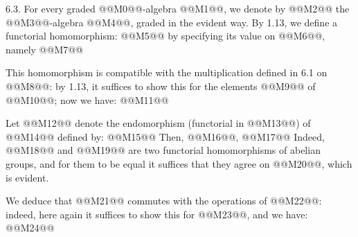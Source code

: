 6.3.
For every graded @@M0@@-algebra @@M1@@, we denote by @@M2@@ the @@M3@@-algebra @@M4@@, graded in the evident way. By 1.13, we define a functorial homomorphism: @@M5@@ by specifying its value on @@M6@@, namely
@@M7@@

This homomorphism is compatible with the multiplication defined in 6.1 on @@M8@@: by 1.13, it suffices to show this for the elements @@M9@@ of @@M10@@; now we have:
@@M11@@

Let @@M12@@ denote the endomorphism (functorial in @@M13@@) of @@M14@@ defined by:
@@M15@@
Then, @@M16@@,
@@M17@@
Indeed, @@M18@@ and @@M19@@ are two functorial homomorphisms of abelian groups, and for them to be equal it suffices that they agree on @@M20@@, which is evident.

We deduce that @@M21@@ commutes with the operations of @@M22@@: indeed, here again it suffices to show this for @@M23@@, and we have:
@@M24@@

